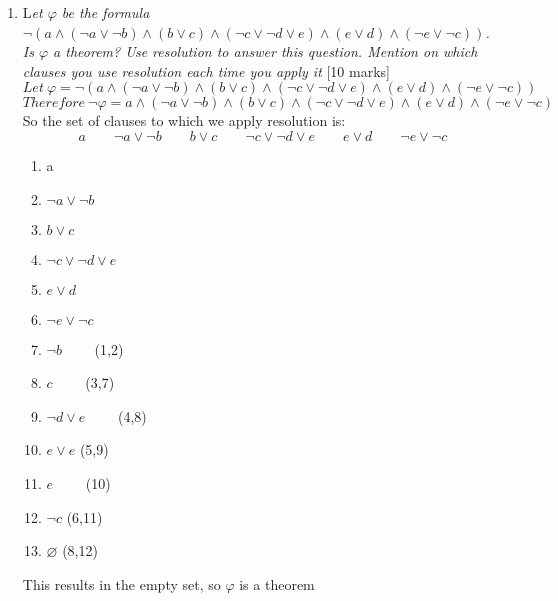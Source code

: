 \documentclass{article}[18pt]
\begin{document}
\begin{enumerate}
\newpage
\item L\textit{et $\varphi$ be the formula $\neg ( a \land ( \neg a \lor \neg b ) \land ( b \lor c ) \land ( \neg c \lor \neg d \lor e ) \land ( e \lor d ) \land ( \neg e \lor \neg c ) )$. Is $\varphi$ a theorem? Use resolution to answer this question. Mention on which clauses you use resolution each time you apply it} \hfill [10 marks]
$$Let \ \varphi = \neg ( a \land ( \neg a \lor \neg b ) \land ( b \lor c ) \land ( \neg c \lor \neg d \lor e ) \land ( e \lor d ) \land ( \neg e \lor \neg c ) )$$
$$Therefore \ \lnot \varphi =  a \land ( \neg a \lor \neg b ) \land ( b \lor c ) \land ( \neg c \lor \neg d \lor e ) \land ( e \lor d ) \land ( \neg e \lor \neg c ) $$
So the set of clauses to which we apply resolution is:
$$a \qquad \lnot a \lor \lnot b \qquad b\lor c \qquad \lnot c\lor \lnot d \lor e \qquad e\lor d \qquad \lnot e\lor\lnot c$$
\begin{enumerate}[label=(\arabic*)]
	\item a
	\item $\lnot a \lor \lnot b$
	\item $b\lor c$
	\item $\lnot c \lor \lnot d \lor e$
	\item $e\lor d$
	\item $\lnot e\lor \lnot c$
	\item $\lnot b \qquad$ \hfill(1,2)
	\item $c\qquad$ \hfill (3,7)
	\item $\lnot d\lor e\qquad$ \hfill (4,8)
	\item $e\lor e$ \hfill (5,9)
	\item $e\qquad$ \hfill (10)  
	\item $\lnot c$ \hfill (6,11)
	\item $\varnothing$ \hfill (8,12) 
\end{enumerate}
This results in the empty set, so $\varphi$ is a theorem

\end{enumerate}
\newpage


\end{document}

